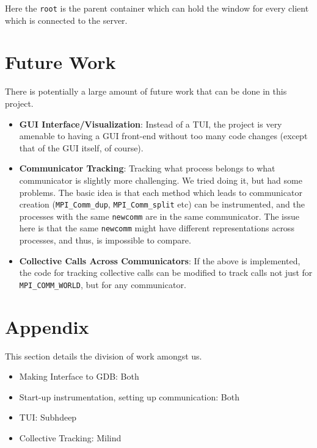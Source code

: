 \documentclass[10pt,conference]{IEEEtran}
\begin{document}
Here the \texttt{root} is the parent container which can hold the window for every client which is connected to the server.

\section{Future Work}

There is potentially a large amount of future work that can be done in this project.

\begin{itemize}
\item \textbf{GUI Interface/Visualization}: Instead of a TUI, the project is very amenable to having a GUI front-end without too many code changes (except that of the GUI itself, of course).
\item \textbf{Communicator Tracking}: Tracking what process belongs to what communicator is slightly more challenging. We tried doing it, but had some problems. The basic idea is that each method which leads to communicator creation (\texttt{MPI\_Comm\_dup}, \texttt{MPI\_Comm\_split} etc) can be instrumented, and the processes with the same \texttt{newcomm} are in the same communicator. The issue here is that the same \texttt{newcomm} might have different representations across processes, and thus, is impossible to compare.
\item \textbf{Collective Calls Across Communicators}: If the above is implemented, the code for tracking collective calls can be modified to track calls not just for \texttt{MPI\_COMM\_WORLD}, but for any communicator.
\end{itemize}

\section{Appendix}

This section details the division of work amongst us.

\begin{itemize}
\item Making Interface to GDB: Both
\item Start-up instrumentation, setting up communication: Both
\item TUI: Subhdeep
\item Collective Tracking: Milind
\end{itemize}



\end{document}
